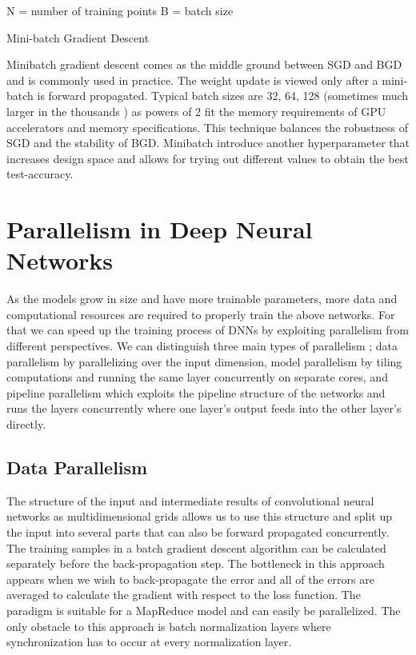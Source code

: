 \begin{minipage}{.7\linewidth}
\begin{algorithm}[H]
N = number of training points\;
B = batch size\;
 \caption{Mini-batch Gradient Descent}
\end{algorithm}
\end{minipage}

Minibatch gradient descent comes as the middle ground between SGD and BGD and is commonly used in practice. The weight update is viewed only after a mini-batch is forward propagated. Typical batch sizes are 32, 64, 128 (sometimes much larger in the thousands )  as powers of 2 fit the memory requirements of GPU accelerators and memory specifications. This technique balances the robustness of SGD and the stability of BGD. Minibatch introduce another hyperparameter that increases design space and allows for trying out different values to obtain the best test-accuracy.


\section{Parallelism in Deep Neural Networks}
As the models grow in size and have more trainable parameters, more data and computational resources are required to properly train the above networks. For that we can speed up the training process of DNNs by exploiting parallelism from different perspectives. We can distinguish three main types of parallelism \cite{ddl}; data parallelism by parallelizing over the input dimension, model parallelism by tiling computations and running the same layer concurrently on separate cores, and pipeline parallelism which exploits the pipeline structure of the networks and runs the layers concurrently where one layer’s output feeds into the other layer's directly. 

\subsection{Data Parallelism}
The structure of the input and intermediate results of convolutional neural networks as multidimensional grids allows us to use this structure and split up the input into several parts that can also be forward propagated concurrently. The training samples in a batch gradient descent algorithm can be calculated separately before the back-propagation step. The bottleneck in this approach appears when we wish to back-propagate the error and all of the errors are averaged to calculate the gradient with respect to the loss function. The paradigm is suitable for a MapReduce model and can easily be parallelized. The only obstacle to this approach is batch normalization layers where synchronization has to occur at every normalization layer. 

